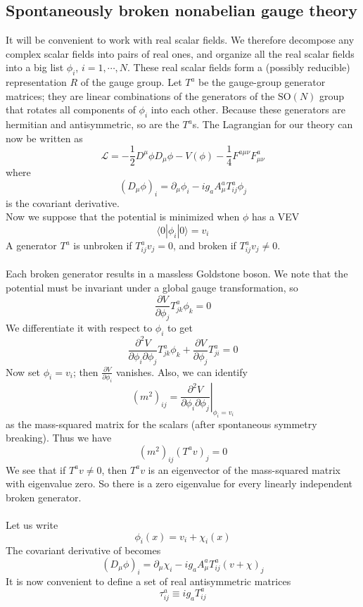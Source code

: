\subsection{Spontaneously broken nonabelian gauge theory}
It will be convenient to work with real scalar fields. We
therefore decompose any complex scalar fields into pairs of real ones, and organize all the real scalar fields into a big list $\phi_i$, $i = 1,\cdots,N$. 
These real scalar fields form a (possibly reducible) representation $R$ of the gauge group. Let $T^a$ be the gauge-group generator matrices; they are linear combinations of the generators of the $\mathrm{SO}(N)$ group that rotates all components of $\phi_i$ into each other. Because these generators are hermitian and antisymmetric, so are the  $T^a$s. The Lagrangian for our theory can now be written as
\[\mathcal{L} = -\frac{1}{2}D^{\mu}\phi D_{\mu}\phi - V(\phi) - \frac{1}{4}F^{a\mu\nu}F^a_{\mu\nu}\]
where
\[(D_{\mu}\phi)_i = \partial_{\mu}\phi_i - ig_aA^a_{\mu}T^a_{ij}\phi_j\]
is the covariant derivative.
\\
Now we suppose that the potential is minimized when $\phi$ has a VEV
\[\langle 0 | \phi_i | 0 \rangle = v_i\]
A generator $T^a$ is unbroken if $T^a_{ij}v_j = 0$, and broken if $T^a_{ij}v_j \neq 0$.
\\ \\
Each broken generator results in a massless Goldstone boson. We note that the potential must be invariant under a global gauge transformation, so
\[\frac{\partial V}{\partial \phi_j} T^a_{jk}\phi_k = 0\]
We differentiate it with respect to $\phi_i$ to get
\[\frac{\partial^2 V}{\partial \phi_i \partial \phi_j} T^a_{jk}\phi_k + \frac{\partial V}{\partial \phi_j} T^a_{ji} = 0 \]
Now set $\phi_i = v_i$; then $\frac{\partial V}{\partial \phi_i}$ vanishes. Also, we can identify
\[(m^2)_{ij} = \left. \frac{\partial^2 V}{\partial \phi_i \partial \phi_j} \right|_{\phi_i = v_i}\]
as the mass-squared matrix for the scalars (after spontaneous symmetry breaking). Thus we have
\[(m^2)_{ij} (T^av)_j = 0\]
We see that if $T^av \neq 0$, then $T^av$ is an eigenvector of the mass-squared matrix with eigenvalue zero. So there is a zero eigenvalue for every linearly independent broken generator.
\\ \\
Let us write
\[\phi_i(x) = v_i + \chi_i(x)\]
The covariant derivative of becomes
\[(D_{\mu}\phi)_i = \partial_{\mu}\chi_i - ig_aA^a_{\mu}T^a_{ij}(v+\chi)_j\]
It is now convenient to define a set of real antisymmetric matrices
\[\tau^a_{ij} \equiv ig_aT^a_{ij}\]
